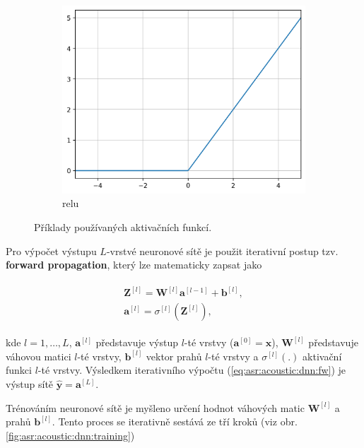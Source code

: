 \begin{figure}[htpb]
\begin{subfigure}[b]{0.28\textwidth}
    \includegraphics[width=\textwidth]{./ch4-asr/img/relu.png}
    \caption{relu}
    \label{fig:asr:acoustic:dnn:activation:relu}
  \end{subfigure}
  \caption{Příklady používaných aktivačních funkcí.}
  \label{fig:asr:acoustic:dnn:activation}
\end{figure}

\newpage Pro výpočet výstupu $L$-vrstvé neuronové sítě je použit iterativní postup tzv. \textbf{forward propagation}, který lze matematicky zapsat jako

\begin{align}
  \begin{split}
    \mathbf{Z}^{[l]} = \mathbf{W}^{[l]}\mathbf{a}^{[l-1]} + \mathbf{b}^{[l]}, \\
    \mathbf{a}^{[l]} = \sigma^{[l]}\left(\mathbf{Z}^{[l]}\right),
  \end{split}
  \label{eq:asr:acoustic:dnn:fw}
\end{align}

\noindent kde $l = 1, \dots, L$, $\boldsymbol{a}^{[l]}$ představuje výstup $l$-té vrstvy ($\boldsymbol{a}^{[0]} = \boldsymbol{x}$), $\mathbf{W}^{[l]}$ představuje váhovou matici $l$-té vrstvy, $\mathbf{b}^{[l]}$ vektor prahů $l$-té vrstvy a $\sigma^{[l]}(.)$ aktivační funkci $l$-té vrstvy. Výsledkem iterativního výpočtu (\ref{eq:asr:acoustic:dnn:fw}) je výstup sítě $\hat{\boldsymbol{y}} = \boldsymbol{a}^{[L]}$.

Trénováním neuronové sítě je myšleno určení hodnot váhových matic $\mathbf{W}^{[l]}$ a prahů $\mathbf{b}^{[l]}$. Tento proces se iterativně sestává ze tří kroků (viz obr. \ref{fig:asr:acoustic:dnn:training})


